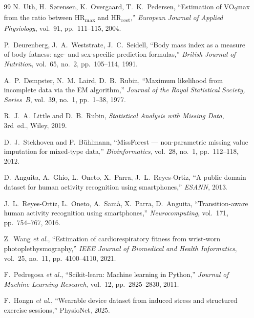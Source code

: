 \documentclass[sigconf,nonacm]{acmart}
\begin{document}
\begin{thebibliography}{99}
 N.~Uth, H.~S{\o}rensen, K.~Overgaard, T.~K.~Pedersen,
  ``Estimation of VO\textsubscript{2}max from the ratio between
  HR\textsubscript{max} and HR\textsubscript{rest},''
  \emph{European Journal of Applied Physiology},
  vol.~91, pp.~111--115, 2004.

 P.~Deurenberg, J.~A.~Weststrate, J.~C.~Seidell,
  ``Body mass index as a measure of body fatness: age- and
  sex-specific prediction formulas,''
  \emph{British Journal of Nutrition}, vol.~65, no.~2,
  pp.~105--114, 1991.

 A.~P.~Dempster, N.~M.~Laird, D.~B.~Rubin,
  ``Maximum likelihood from incomplete data via the EM algorithm,''
  \emph{Journal of the Royal Statistical Society, Series~B},
  vol.~39, no.~1, pp.~1--38, 1977.

 R.~J.~A.~Little and D.~B.~Rubin,
  \emph{Statistical Analysis with Missing Data},
  3rd~ed., Wiley, 2019.

 D.~J.~Stekhoven and P.~B\"uhlmann,
  ``MissForest --- non-parametric missing value imputation for
  mixed-type data,''
  \emph{Bioinformatics}, vol.~28, no.~1, pp.~112--118, 2012.

 D.~Anguita, A.~Ghio, L.~Oneto, X.~Parra,
  J.~L.~Reyes-Ortiz, ``A public domain dataset for human activity
  recognition using smartphones,''
  \emph{ESANN}, 2013.

 J.~L.~Reyes-Ortiz, L.~Oneto, A.~Sam\`a, X.~Parra,
  D.~Anguita, ``Transition-aware human activity recognition using
  smartphones,''
  \emph{Neurocomputing}, vol.~171, pp.~754--767, 2016.

 Z.~Wang \emph{et al.},
  ``Estimation of cardiorespiratory fitness from wrist-worn
  photoplethysmography,''
  \emph{IEEE Journal of Biomedical and Health Informatics},
  vol.~25, no.~11, pp.~4100--4110, 2021.

 F.~Pedregosa \emph{et al.},
  ``Scikit-learn: Machine learning in Python,''
  \emph{Journal of Machine Learning Research}, vol.~12,
  pp.~2825--2830, 2011.

 F.~Hongn \emph{et al.},
  ``Wearable device dataset from induced stress and structured
  exercise sessions,'' PhysioNet, 2025.
\end{thebibliography}
\end{document}

